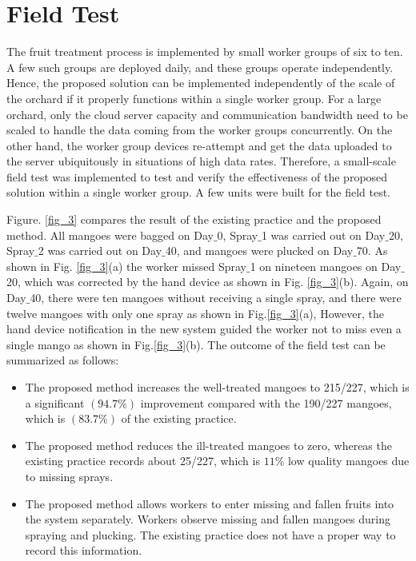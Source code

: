 \documentclass[journal]{IEEEtran}
\begin{document}
\section{Field Test}
The fruit treatment process is implemented by small worker groups of six to ten. A few such groups are deployed daily, and these groups operate independently. Hence, the proposed solution can be implemented independently of the scale of the orchard if it properly functions within a single worker group. For a large orchard, only the cloud server capacity and communication bandwidth need to be scaled to handle the data coming from the worker groups concurrently. On the other hand, the worker group devices re-attempt and get the data uploaded to the server ubiquitously in situations of high data rates. Therefore, a small-scale field test was implemented to test and verify the effectiveness of the proposed solution within a single worker group. A few units were built for the field test.\par
Figure. \ref{fig_3} compares the result of the existing practice and the proposed method. All mangoes were bagged on Day$\_$0, Spray$\_$1 was carried out on Day$\_$20, Spray$\_$2 was carried out on Day$\_$40, and mangoes were plucked on Day$\_$70. As shown in Fig. \ref{fig_3}(a) the worker missed Spray$\_$1 on nineteen mangoes on Day$\_$20, which was corrected by the hand device as shown in Fig. \ref{fig_3}(b). Again, on Day$\_$40, there were ten mangoes without receiving a single spray, and there were twelve mangoes with only one spray as shown in Fig.\ref{fig_3}(a), However, the hand device notification in the new system guided the worker not to miss even a single mango as shown in Fig.\ref{fig_3}(b). The outcome of the field test can be summarized as follows:
\begin{itemize}
	\item The proposed method increases the well-treated mangoes to 215/227, which is a significant $(94.7\%)$ improvement compared with the 190/227 mangoes, which is $(83.7\%)$ of the existing practice.
	\item The proposed method reduces the ill-treated mangoes to zero, whereas the existing practice records about 25/227, which is $11\%$ low quality mangoes due to missing sprays.
	\item The proposed method allows workers to enter missing and fallen fruits into the system separately. Workers observe missing and fallen mangoes during spraying and plucking. The existing practice does not have a proper way to record this information.
\end{itemize}
\end{document}
